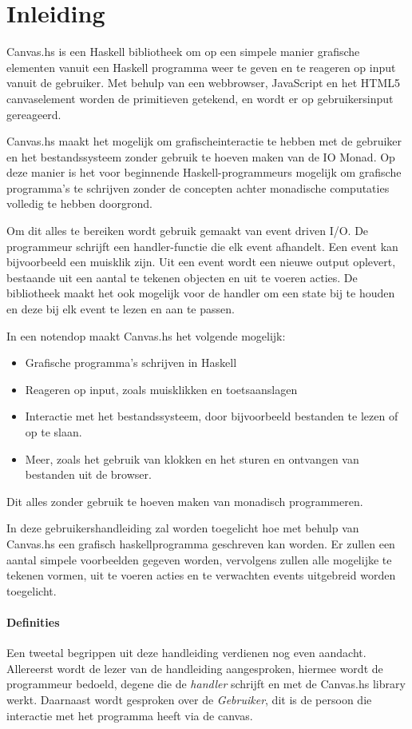 \section{Inleiding}

Canvas.hs is een Haskell bibliotheek om op een simpele manier grafische elementen vanuit een Haskell programma weer te geven en te reageren op input vanuit de gebruiker. Met behulp van een webbrowser, JavaScript en het HTML5 canvaselement worden de primitieven getekend, en wordt er op gebruikersinput gereageerd.

Canvas.hs maakt het mogelijk om grafischeinteractie te hebben met de gebruiker en het bestandssysteem zonder gebruik te hoeven maken van de IO Monad. Op deze manier is het voor beginnende Haskell-programmeurs mogelijk om grafische programma's te schrijven zonder de concepten achter monadische computaties volledig te hebben doorgrond.

Om dit alles te bereiken wordt gebruik gemaakt van event driven I/O. De programmeur schrijft een handler-functie die elk event  afhandelt. Een event kan bijvoorbeeld een muisklik zijn. Uit een event wordt een nieuwe output oplevert, bestaande uit een aantal te tekenen objecten en uit te voeren acties. De bibliotheek maakt het ook mogelijk voor de handler om een state bij te houden en deze bij elk event te lezen en aan te passen. 

In een notendop maakt Canvas.hs het volgende mogelijk:
\begin{itemize}
	\item Grafische programma's schrijven in Haskell
	\item Reageren op input, zoals muisklikken en toetsaanslagen
	\item Interactie met het bestandssysteem, door bijvoorbeeld bestanden te lezen of op te slaan.
	\item Meer, zoals het gebruik van klokken en het sturen en ontvangen van bestanden uit de browser.
\end{itemize}
Dit alles zonder gebruik te hoeven maken van monadisch programmeren.

In deze gebruikershandleiding zal worden toegelicht hoe met behulp van Canvas.hs een grafisch haskellprogramma geschreven kan worden. Er zullen een aantal simpele voorbeelden gegeven worden, vervolgens zullen alle mogelijke te tekenen vormen, uit te voeren acties en te verwachten events uitgebreid worden toegelicht. 

\paragraph{Definities}
Een tweetal begrippen uit deze handleiding verdienen nog even aandacht. Allereerst wordt de lezer van de handleiding aangesproken, hiermee wordt de programmeur bedoeld, degene die de \emph{handler} schrijft en met de Canvas.hs library werkt. Daarnaast wordt gesproken over de \emph{Gebruiker}, dit is de persoon die interactie met het programma heeft via de canvas.

